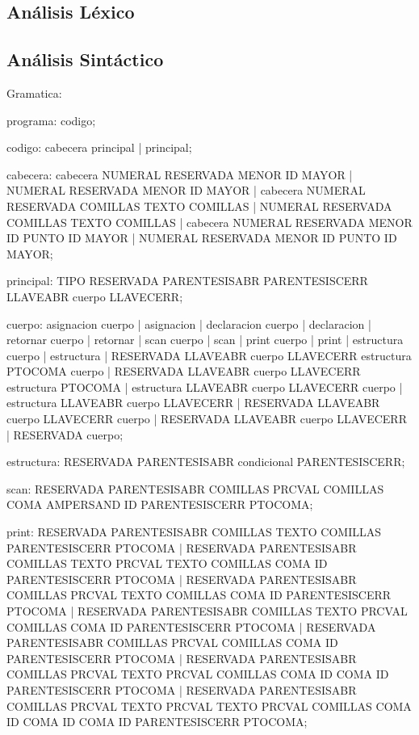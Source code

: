 \documentclass[aspectratio=169]{article}
\begin{document}
\subsection{An\'alisis L\'exico}

\subsection{An\'alisis Sint\'actico}

Gramatica:

programa:
	codigo;

codigo:
	cabecera principal | principal;

cabecera:
	cabecera NUMERAL RESERVADA MENOR ID MAYOR | NUMERAL RESERVADA MENOR ID MAYOR
	|
	cabecera NUMERAL RESERVADA COMILLAS TEXTO COMILLAS | NUMERAL RESERVADA COMILLAS TEXTO COMILLAS
	|
	cabecera NUMERAL RESERVADA MENOR ID PUNTO ID MAYOR | NUMERAL RESERVADA MENOR ID PUNTO ID MAYOR;

principal:
	TIPO RESERVADA PARENTESISABR PARENTESISCERR LLAVEABR cuerpo LLAVECERR;

cuerpo:
	asignacion cuerpo | asignacion | declaracion cuerpo | declaracion
	|
	retornar cuerpo | retornar | scan cuerpo | scan | print cuerpo | print | estructura cuerpo | estructura
	|
	RESERVADA LLAVEABR cuerpo LLAVECERR estructura PTOCOMA cuerpo | RESERVADA LLAVEABR cuerpo LLAVECERR estructura PTOCOMA
	|
	estructura LLAVEABR cuerpo LLAVECERR cuerpo | estructura LLAVEABR cuerpo LLAVECERR
	|
	RESERVADA LLAVEABR cuerpo LLAVECERR cuerpo | RESERVADA LLAVEABR cuerpo LLAVECERR | RESERVADA cuerpo;

estructura:
	RESERVADA PARENTESISABR condicional PARENTESISCERR;

scan:
	RESERVADA PARENTESISABR COMILLAS PRCVAL COMILLAS COMA  AMPERSAND ID PARENTESISCERR PTOCOMA;

print:
	RESERVADA PARENTESISABR COMILLAS TEXTO COMILLAS PARENTESISCERR PTOCOMA
	|
	RESERVADA PARENTESISABR COMILLAS TEXTO PRCVAL TEXTO COMILLAS COMA ID PARENTESISCERR PTOCOMA
	|
	RESERVADA PARENTESISABR COMILLAS PRCVAL TEXTO COMILLAS COMA ID PARENTESISCERR PTOCOMA
	|
	RESERVADA PARENTESISABR COMILLAS TEXTO PRCVAL COMILLAS COMA ID PARENTESISCERR PTOCOMA
	|
	RESERVADA PARENTESISABR COMILLAS PRCVAL COMILLAS COMA ID PARENTESISCERR PTOCOMA
	|
	RESERVADA PARENTESISABR COMILLAS PRCVAL TEXTO PRCVAL COMILLAS COMA ID COMA ID PARENTESISCERR PTOCOMA
	|
	RESERVADA PARENTESISABR COMILLAS PRCVAL TEXTO PRCVAL TEXTO PRCVAL COMILLAS COMA ID COMA ID COMA ID PARENTESISCERR PTOCOMA;
\end{document}
